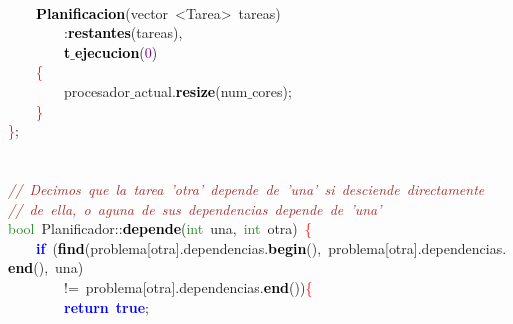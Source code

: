 \mbox{} \\
\mbox{}\ \ \ \ \textbf{\textcolor{Black}{Planificacion}}\textcolor{BrickRed}{(}vector\ \textcolor{BrickRed}{\textless{}}Tarea\textcolor{BrickRed}{\textgreater{}}\ tareas\textcolor{BrickRed}{)} \\
\mbox{}\ \ \ \ \ \ \ \ \textcolor{BrickRed}{:}\textbf{\textcolor{Black}{restantes}}\textcolor{BrickRed}{(}tareas\textcolor{BrickRed}{),} \\
\mbox{}\ \ \ \ \ \ \ \ \textbf{\textcolor{Black}{t$\_$ejecucion}}\textcolor{BrickRed}{(}\textcolor{Purple}{0}\textcolor{BrickRed}{)} \\
\mbox{}\ \ \ \ \textcolor{Red}{\{} \\
\mbox{}\ \ \ \ \ \ \ \ procesador$\_$actual\textcolor{BrickRed}{.}\textbf{\textcolor{Black}{resize}}\textcolor{BrickRed}{(}num$\_$cores\textcolor{BrickRed}{);} \\
\mbox{}\ \ \ \ \textcolor{Red}{\}} \\
\mbox{}\textcolor{Red}{\}}\textcolor{BrickRed}{;} \\
\mbox{} \\
\mbox{} \\
\mbox{}\textit{\textcolor{Brown}{//\ Decimos\ que\ la\ tarea\ 'otra'\ depende\ de\ 'una'\ si\ desciende\ directamente}} \\
\mbox{}\textit{\textcolor{Brown}{//\ de\ ella,\ o\ aguna\ de\ sus\ dependencias\ depende\ de\ 'una'}} \\
\mbox{}\textcolor{ForestGreen}{bool}\ Planificador\textcolor{BrickRed}{::}\textbf{\textcolor{Black}{depende}}\textcolor{BrickRed}{(}\textcolor{ForestGreen}{int}\ una\textcolor{BrickRed}{,}\ \textcolor{ForestGreen}{int}\ otra\textcolor{BrickRed}{)}\ \textcolor{Red}{\{} \\
\mbox{}\ \ \ \ \textbf{\textcolor{Blue}{if}}\ \textcolor{BrickRed}{(}\textbf{\textcolor{Black}{find}}\textcolor{BrickRed}{(}problema\textcolor{BrickRed}{[}otra\textcolor{BrickRed}{].}dependencias\textcolor{BrickRed}{.}\textbf{\textcolor{Black}{begin}}\textcolor{BrickRed}{(),}\ problema\textcolor{BrickRed}{[}otra\textcolor{BrickRed}{].}dependencias\textcolor{BrickRed}{.}\textbf{\textcolor{Black}{end}}\textcolor{BrickRed}{(),}\ una\textcolor{BrickRed}{)} \\
\mbox{}\ \ \ \ \ \ \ \ \textcolor{BrickRed}{!=}\ problema\textcolor{BrickRed}{[}otra\textcolor{BrickRed}{].}dependencias\textcolor{BrickRed}{.}\textbf{\textcolor{Black}{end}}\textcolor{BrickRed}{())}\textcolor{Red}{\{} \\
\mbox{}\ \ \ \ \ \ \ \ \textbf{\textcolor{Blue}{return}}\ \textbf{\textcolor{Blue}{true}}\textcolor{BrickRed}{;} \\
